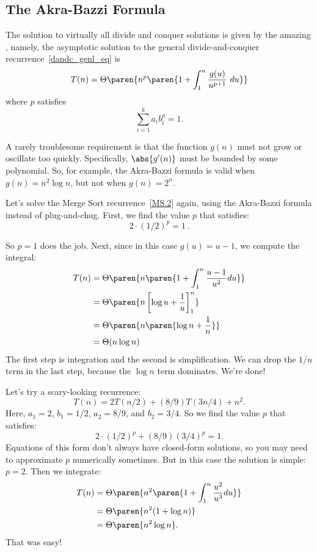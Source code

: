 \subsection{The Akra-Bazzi Formula}

The solution to virtually all divide and conquer solutions is given by
the amazing , namely,
the asymptotic solution to the general
divide-and-conquer recurrence~\eqref{dandc_genl_eq} is
\[
T(n) = \Theta\paren{n^p \paren{1 + \int_1^n \frac{g(u)}{u^{p+1}}\ du}}
\]
where $p$ satisfies
\[
\sum_{i=1}^k {a_i b_i^p} = 1.
\]

A rarely troublesome requirement is that the function $g(n)$ must not
grow or oscillate too quickly.  Specifically, $\abs{g'(n)}$ must be
bounded by some polynomial.  So, for example, the Akra-Bazzi formula
is valid when $g(n) = n^2 \log n$, but not when $g(n) = 2^n$.

Let's solve the Merge Sort recurrence~\eqref{MS.2} again,
using the Akra-Bazzi formula instead of plug-and-chug.  First, we find
the value $p$ that satisfies:
\[
2 \cdot (1/2)^p = 1\, .
\]

So $p = 1$ does the job.  Next, since in this case
  $g(u) = u-1$, we compute the integral:
\begin{align*}
T(n) & = \Theta\paren{n \paren{1 + \int_1^n \frac{u - 1}{u^2} du}} \\
  & = \Theta\paren{ n\left[\log u + \frac{1}{u}\right]_1^n}\\
  & = \Theta\paren{n \paren{\log n + \frac{1}{n}}} \\
  & = \Theta(n\log n)
\end{align*}
The first step is integration and the second is simplification.  We
can drop the $1/n$ term in the last step, because the $\log n$ term
dominates.  We're done!

Let's try a scary-looking recurrence:
\[
T(n) = 2T(n/2) + (8/9)T(3n/4) + n^2.
\]
Here, $a_1 = 2$, $b_1 = 1/2$, $a_2 = 8/9$, and $b_2 = 3/4$.  So we
find the value $p$ that satisfies:
\[
2 \cdot (1/2)^p + (8/9) (3/4)^p = 1.
\]
Equations of this form don't always have closed-form solutions, so you
may need to approximate $p$ numerically sometimes.  But in this case
the solution is simple: $p = 2$.  Then we integrate:
\begin{align*}
T(n) & = \Theta\paren{n^2 \paren{1 + \int_1^n \frac{u^2}{u^3} du}} \\
  & = \Theta\paren{n^2 (1 + \log n)} \\
  & = \Theta\paren{n^2 \log n}.
\end{align*}
That was easy!

